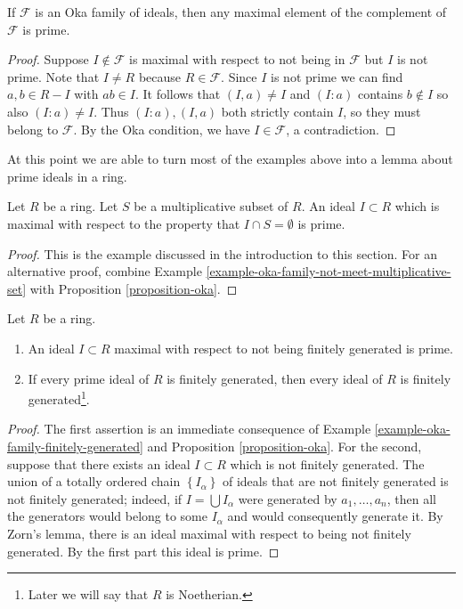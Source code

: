 \begin{proposition}
\label{proposition-oka}
If $\mathcal{F}$ is an Oka family of ideals, then any maximal element of
the complement of $\mathcal{F}$ is prime.
\end{proposition}

\begin{proof}
Suppose $I \not \in \mathcal{F}$ is maximal with respect to not being in
$\mathcal{F}$ but $I$ is not prime. Note that $I \not = R$ because
$R \in \mathcal{F}$. Since $I$ is not prime we can find $a, b \in R - I$
with $ab \in I$. It follows that $(I, a) \neq I$ and $(I : a)$ contains
$b \not \in I$ so also $(I : a) \neq I$. Thus $(I : a), (I, a)$ both
strictly contain $I$, so they must belong to $\mathcal{F}$.
By the Oka condition, we have $I \in \mathcal{F}$, a contradiction.
\end{proof}

\noindent
At this point we are able to turn most of the examples above into
a lemma about prime ideals in a ring.

\begin{lemma}
\label{lemma-simple}
Let $R$ be a ring. Let $S$ be a multiplicative subset of $R$.
An ideal $I \subset R$ which is maximal with respect to the property
that $I \cap S = \emptyset$ is prime.
\end{lemma}

\begin{proof}
This is the example discussed in the introduction to this section.
For an alternative proof, combine
Example \ref{example-oka-family-not-meet-multiplicative-set}
with
Proposition \ref{proposition-oka}.
\end{proof}

\begin{lemma}
\label{lemma-cohen}
Let $R$ be a ring.
\begin{enumerate}
\item An ideal $I \subset R$ maximal with respect to not being
finitely generated is prime.
\item If every prime ideal of $R$ is
finitely generated, then
every ideal of $R$ is finitely generated\footnote{Later we will say
that $R$ is Noetherian.}.
\end{enumerate}
\end{lemma}

\begin{proof}
The first assertion is an immediate consequence of
Example \ref{example-oka-family-finitely-generated} and
Proposition \ref{proposition-oka}. For the second,
suppose that there exists an ideal $I \subset R$ which is not finitely
generated. The union of a totally ordered chain $\left\{I_\alpha\right\}$
of ideals that are not finitely generated is not finitely generated;
indeed, if $I = \bigcup I_\alpha$ were generated by
$a_1, \ldots, a_n$, then all the generators would belong to some
$I_\alpha $ and would consequently generate it.
By Zorn's lemma, there is an ideal maximal with respect to being not finitely
generated. By the first part this ideal is prime.
\end{proof}

